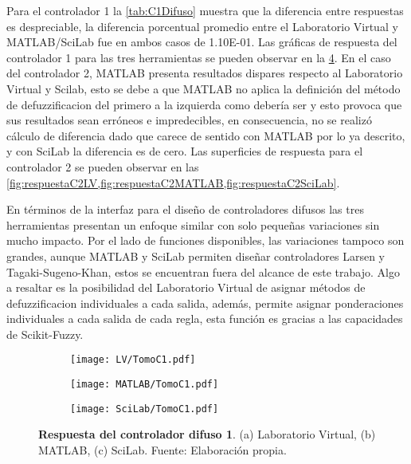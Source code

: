         Para el controlador 1 la \cref{tab:C1Difuso} muestra que la diferencia entre respuestas es despreciable, la diferencia porcentual promedio entre el Laboratorio Virtual y MATLAB/SciLab fue en ambos casos de \num{1.10E-01}. Las gráficas de respuesta del controlador 1 para las tres herramientas se pueden observar en la \cref{fig:respuestaC1}. En el caso del controlador 2, MATLAB presenta resultados dispares respecto al Laboratorio Virtual y Scilab, esto se debe a que MATLAB no aplica la definición del método de defuzzificacion del primero a la izquierda como debería ser y esto provoca que sus resultados sean erróneos e impredecibles, en consecuencia, no se realizó cálculo de diferencia dado que carece de sentido con MATLAB por lo ya descrito, y con SciLab la diferencia es de cero. Las superficies de respuesta para el controlador 2 se pueden observar en las \cref{fig:respuestaC2LV,fig:respuestaC2MATLAB,fig:respuestaC2SciLab}.

        En términos de la interfaz para el diseño de controladores difusos las tres herramientas presentan un enfoque similar con solo pequeñas variaciones sin mucho impacto. Por el lado de funciones disponibles, las variaciones tampoco son grandes, aunque MATLAB y SciLab permiten diseñar controladores Larsen y Tagaki-Sugeno-Khan, estos se encuentran fuera del alcance de este trabajo. Algo a resaltar es la posibilidad del Laboratorio Virtual de asignar métodos de defuzzificacion individuales a cada salida, además, permite asignar ponderaciones individuales a cada salida de cada regla, esta función es gracias a las capacidades de Scikit-Fuzzy.

        \begin{figure}[htb]
            \centering
            \begin{subfigure}[t]{0.32\textwidth}
                \centering
                \texttt{[image: LV/TomoC1.pdf]}
                \caption{}
                \label{fig:respuestaC11}
            \end{subfigure}
            \hfill
            \begin{subfigure}[t]{0.32\textwidth}
                \centering
                \texttt{[image: MATLAB/TomoC1.pdf]}
                \caption{}
                \label{fig:respuestaC12}
            \end{subfigure}
            \hfill
            \begin{subfigure}[t]{0.32\textwidth}
                \centering
                \texttt{[image: SciLab/TomoC1.pdf]}
                \caption{}
                \label{fig:respuestaC13}
            \end{subfigure}
            
            \caption[Comparación - Respuesta del controlador difuso 1]{\textbf{Respuesta del controlador difuso 1}. (a) Laboratorio Virtual, (b) MATLAB, (c) SciLab. Fuente: Elaboración propia. \label{fig:respuestaC1}}
        \end{figure}

